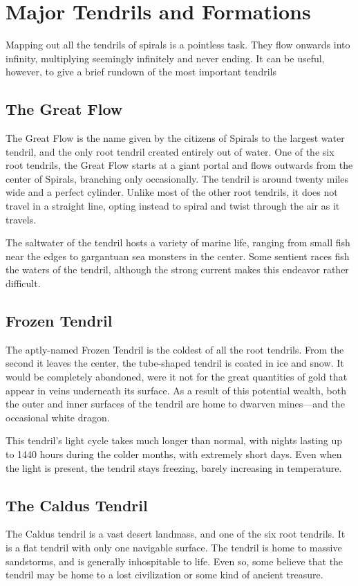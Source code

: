 \chapter{Major Tendrils and Formations}
Mapping out all the tendrils of spirals is a pointless task.
They flow onwards into infinity, multiplying seemingly infinitely and never ending.
It can be useful, however, to give a brief rundown of the most important tendrils

\begin{multicols}{2}




\section{The Great Flow}
The Great Flow is the name given by the citizens of Spirals to the largest water tendril, and the only root tendril created entirely out of water.
One of the six root tendrils, the Great Flow starts at a giant portal and flows outwards from the center of Spirals, branching only occasionally.
The tendril is around twenty miles wide and a perfect cylinder.
Unlike most of the other root tendrils, it does not travel in a straight line, opting instead to spiral and twist through the air as it travels.

The saltwater of the tendril hosts a variety of marine life, ranging from small fish near the edges to gargantuan sea monsters in the center.
Some sentient races fish the waters of the tendril, although the strong current makes this endeavor rather difficult.

\section{Frozen Tendril}
The aptly-named Frozen Tendril is the coldest of all the root tendrils.
From the second it leaves the center, the tube-shaped tendril is coated in ice and snow.
It would be completely abandoned, were it not for the great quantities of gold that appear in veins underneath its surface.
As a result of this potential wealth, both the outer and inner surfaces of the tendril are home to dwarven mines---and the occasional white dragon.

This tendril's light cycle takes much longer than normal, with nights lasting up to 1440 hours during the colder months, with extremely short days.
Even when the light is present, the tendril stays freezing, barely increasing in temperature.

\section{The Caldus Tendril}
The Caldus tendril is a vast desert landmass, and one of the six root tendrils.
It is a flat tendril with only one navigable surface.
The tendril is home to massive sandstorms, and is generally inhospitable to life.
Even so, some believe that the tendril may be home to a lost civilization or some kind of ancient treasure.


\end{multicols}
